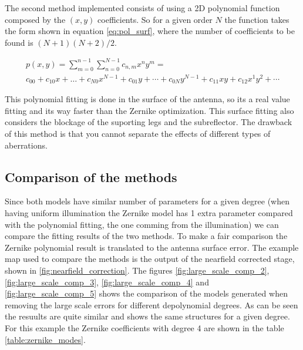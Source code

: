 The second method implemented consists of using a 2D polynomial function composed by the $(x,y)$ coefficients. So for a given order $N$ the function takes the form shown in equation \ref{eq:pol_surf}, where the number of coefficients to be found is $(N+1)(N+2)/2$. 


\begin{gather}
    p(x,y) = \sum_{m=0}^{n-1}\sum_{n=0}^{N-1} c_{n, m} x^{n}y^{m} =\\ 
    c_{00}+c_{10}x+\dots+c_{N0}x^{N-1}+c_{01}y+\cdots+c_{0N}y^{N-1}+c_{11}xy+c_{12}x^1y^2+\cdots
    \label{eq:pol_surf}
\end{gather}

This polynomial fitting is done in the surface of the antenna, so its a real value fitting and its way faster than the Zernike optimization. This surface fitting also considers the blockage of the suporting legs and the subreflector.
The drawback of this method is that you cannot separate the effects of different types of aberrations.


\subsection{Comparison of the methods}

Since both models have similar number of parameters for a given degree (when having uniform illumination the Zernike model has 1 extra parameter compared with the polynomial fitting, the one comming from the illumination) we can compare the fitting results of the two methods. To make a fair comparison the Zernike polynomial result is translated to the antenna surface error. The example map used to compare the methods is the output of the nearfield corrected stage, shown in \ref{fig:nearfield_correction}.
The figures \ref{fig:large_scale_comp_2}, \ref{fig:large_scale_comp_3}, \ref{fig:large_scale_comp_4} and \ref{fig:large_scale_comp_5} shows the comparison of the models generated when removing the large scale errors for different depolynomial degrees. As can be seen the resuults are quite similar and shows the same structures for a given degree. 
For this example the Zernike coefficients with degree 4 are shown in the table \ref{table:zernike_modes}.


